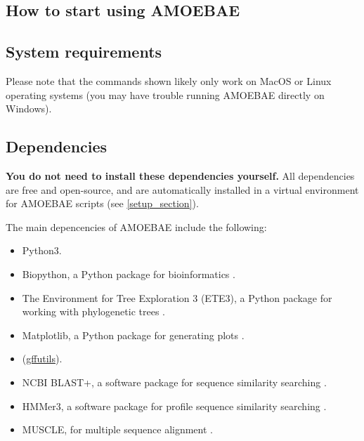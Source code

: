 \documentclass[12pt,letterpaper]{article}
\begin{document}
\begin{linenumbers}
\section{How to start using AMOEBAE}

\subsection{System requirements}

Please note that the commands shown likely only work on MacOS or Linux operating
systems (you may have trouble running AMOEBAE directly on Windows). 


\subsection{Dependencies}
\label{dependencies_section}

\textbf{You do not need to install these dependencies yourself.} All
dependencies are free and open-source, and are automatically installed in a
virtual environment for AMOEBAE scripts (see \autoref*{setup_section}).

The main depencencies of AMOEBAE include the following:

\begin{itemize}

\item Python3.

\item Biopython, a Python package for bioinformatics \citep{cock2009}.

\item The Environment for Tree Exploration 3 (ETE3), a Python package for
    working with phylogenetic trees \citep{huerta-cepas2016}.

\item Matplotlib, a Python package for generating plots \citep{hunter2007}.

\item (\href{https://pythonhosted.org/gffutils/}{gffutils}).

\item NCBI BLAST+, a software package for sequence similarity searching \citep{camacho2009}.

\item HMMer3, a software package for profile sequence similarity searching \citep{eddy1998}.

\item MUSCLE, for multiple sequence alignment \citep{edgar2004}.


\end{itemize}
\end{linenumbers}
\end{document}
